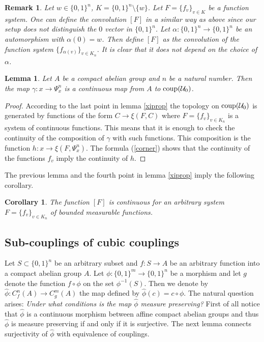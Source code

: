 \documentclass [11pt] {article}
\newtheorem{lemma}{Lemma}[section]
\newtheorem{corollary}{Corollary}[section]
\newtheorem{remark}{Remark}[section]
\begin{document}
\begin{remark}\label{convat} Let $w\in\{0,1\}^n$, $K=\{0,1\}^n\setminus\{w\}$. Let $F=\{f_v\}_{v\in K}$ be a function system. One can define the convolution $[F]$ in a similar way as above since our setup does not distinguish the $0$ vector in $\{0,1\}^n$. Let $\alpha:\{0,1\}^n\rightarrow\{0,1\}^n$ be an automorphism with $\alpha(0)=w$. Then define $[F]$ as the convolution of the function system $\{f_{\alpha(v)}\}_{v\in K_n}$. It is clear that it does not depend on the choice of $\alpha$.
\end{remark}


\begin{lemma} Let $A$ be a compact abelian group and $n$ be a natural number. Then the map $\gamma:x\rightarrow\Psi^n_x$ is a continuous map from $A$ to ${\rm coup}(\mathcal{U}_0)$.
\end{lemma}

\begin{proof} According to the last point in lemma \ref{xiprop} the topology on ${\rm coup}(\mathcal{U}_0)$ is generated by functions of the form $C\rightarrow \xi(F,C)$ where $F=\{f_v\}_{v\in K_n}$ is a system of continuous functions. This means that it is enough to check the continuity of the composition of $\gamma$ with such functions. This composition is the function $h:x\rightarrow\xi(F,\Psi^n_x)$. The formula (\ref{corner}) shows that the continuity of the functions $f_v$ imply the continuity of $h$.
\end{proof}

The previous lemma and the fourth point in lemma \ref{xiprop} imply the following corollary.

\begin{corollary} The function $[F]$ is continuous for an arbitrary system $F=\{f_v\}_{v\in K_n}$ of bounded measurable functions.
\end{corollary}

\subsection{Sub-couplings of cubic couplings}

Let $S\subset\{0,1\}^n$ be an arbitrary subset and $f:S\rightarrow A$ be an arbitrary function into a compact abelian group $A$. 
Let $\phi:\{0,1\}^m\rightarrow\{0,1\}^n$ be a morphism and let $g$ denote the function $f\circ\phi$ on the set $\phi^{-1}(S)$. Then we denote by $\hat{\phi}:C^n_f(A)\rightarrow C^m_g(A)$ the map defined by $\hat{\phi}(c)=c\circ\phi$. The natural question arises: {\it Under what conditions is the map $\hat{\phi}$ measure preserving?}
First of all notice that $\hat{\phi}$ is a continuous morphism between affine compact abelian groups and thus $\hat{\phi}$ is measure preserving if and only if it is surjective. 
The next lemma connects surjectivity of $\hat{\phi}$ with equivalence of couplings.
\end{document}

